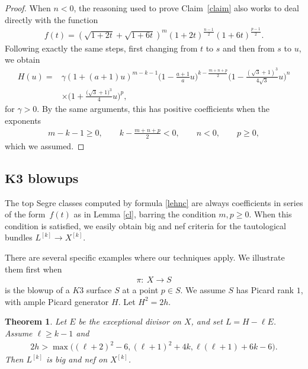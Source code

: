 \documentclass[11pt]{article}
\numberwithin{equation}{section}
\numberwithin{equation}{section}
\newtheorem{Theorem}{Theorem}[section]
\begin{document}
\begin{proof}
When $n<0$, the reasoning used to prove Claim~\ref{claim} also works to deal directly with the function
\begin{gather*}
f(t)=\left(\sqrt{1+2t}+\sqrt{1+6t}\right)^m {(1+2t)}^{\frac{n-1}{2}} (1+6t)^{\frac{p-1}{2}}.
\end{gather*}
Following exactly the same steps, first changing from $t$ to $s$ and then from $s$ to $u$, we obtain
\begin{align*}
H(u)={}&\gamma (1+(a+1)u)^{m-k-1} \biggl(1-\frac{a+1}{a}u\biggr)^{k-\frac{m+n+p}{2}} \biggl(1-\frac{(\sqrt{3}+1)^3}{4\sqrt{3}}u\biggr)^{n}
\\
&\times \biggl(1+\frac{\big(\sqrt{3}+1\big)^3}{4}u\biggr)^p,
\end{align*}
for $\gamma>0$. By the same arguments, this has positive coefficients when the exponents
\begin{gather*}
m-k-1\geq 0, \qquad k-\frac{m+n+p}{2}<0, \qquad n<0, \qquad p\geq 0,
\end{gather*}
which we assumed.
\end{proof}




\subsection[K3 blowups]{$\boldsymbol{K3}$ blowups}
The top Segre classes computed by formula \eqref{lehnc} are always coefficients in series of the form~$f(t)$ as in Lemma \ref{cl}, barring the condition $m, p\geq 0$. When this condition is satisfied, we easily obtain big and nef criteria for the tautological bundles $L^{[k]}\to X^{[k]}$.

There are several specific examples where our techniques apply. We illustrate them first when
\begin{gather*}
\pi\colon\ X\to S
\end{gather*}
is the blowup of a $K3$ surface $S$ at a point $p\in S$. We assume
$S$ has Picard rank $1$, with ample Picard generator $H$. Let $H^2=2h$.

\begin{Theorem}\label{blok}
Let $E$ be the exceptional divisor on $X$, and set $L=H-\ell E$. Assume $\ell\geq k-1$ and
\begin{gather*}
2h>\max \bigl((\ell+2)^2-6, (\ell+1)^2+4k, \ell(\ell+1)+6k-6\bigr).
\end{gather*}
Then $L^{[k]}$ is big and nef on $X^{[k]}$.
\end{Theorem}
\end{document}
